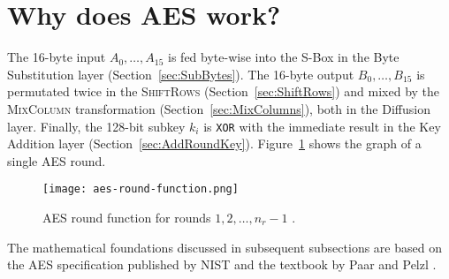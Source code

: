 \section{Why does AES work?}
\label{sec:why}
\label{sec:math}

The 16-byte input $A_0, \dots, A_{15}$ is fed byte-wise into the S-Box in the Byte Substitution layer (Section~\ref{sec:SubBytes}).
The 16-byte output $B_0, \dots, B_{15}$ is permutated twice in the \textsc{ShiftRows} (Section~\ref{sec:ShiftRows}) and mixed by the \textsc{MixColumn} transformation (Section~\ref{sec:MixColumns}), both in the Diffusion layer.
Finally, the 128-bit subkey $k_i$ is \texttt{XOR} with the immediate result in the Key Addition layer (Section~\ref{sec:AddRoundKey}).
Figure~\ref{fig:aes-round-function} shows the graph of a single AES round. 

\begin{figure}[!ht]
    \centering
    \texttt{[image: aes-round-function.png]}
    \caption{
        AES round function for rounds $1, 2, \dots, n_r-1$ \cite{Paar2024}.
    }
    \label{fig:aes-round-function}
\end{figure}

The mathematical foundations discussed in subsequent subsections are based on the \gls{AES} specification published by \gls{NIST} \cite{NIST_AES} and the textbook by Paar and Pelzl \cite{Paar2024}.










